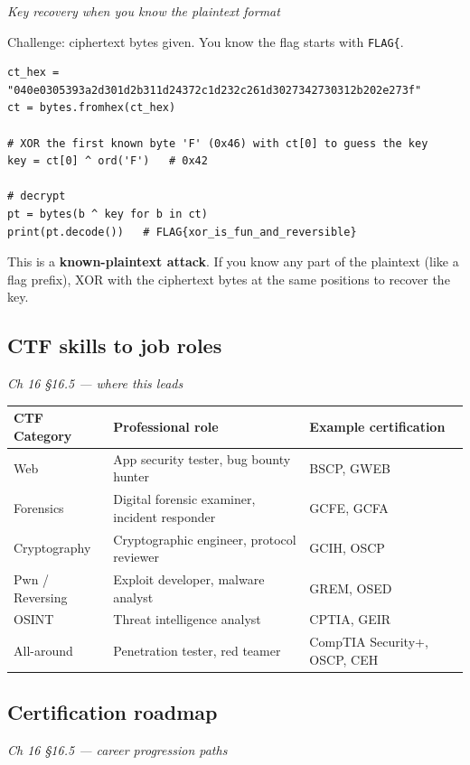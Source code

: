 \documentclass[12pt,openany]{book}
\begin{document}
{\small\itshape\color{gray}Key recovery when you know the plaintext format}

Challenge: ciphertext bytes given. You know the flag starts with \texttt{FLAG\{}.


\begin{lstlisting}
ct_hex = "040e0305393a2d301d2b311d24372c1d232c261d3027342730312b202e273f"
ct = bytes.fromhex(ct_hex)

# XOR the first known byte 'F' (0x46) with ct[0] to guess the key
key = ct[0] ^ ord('F')   # 0x42

# decrypt
pt = bytes(b ^ key for b in ct)
print(pt.decode())   # FLAG{xor_is_fun_and_reversible}\end{lstlisting}


This is a \textbf{known-plaintext attack}. If you know any part of the plaintext (like a flag prefix), XOR with the ciphertext bytes at the same positions to recover the key.

\medskip

\subsection*{CTF skills to job roles}
{\small\itshape\color{gray}Ch 16 §16.5 --- where this leads}

\begin{center}\small\begin{tabular}{p{4.3cm}p{4.3cm}p{4.3cm}}\toprule
\textbf{CTF Category} & \textbf{Professional role} & \textbf{Example certification} \\ \midrule
Web & App security tester, bug bounty hunter & BSCP, GWEB \\
Forensics & Digital forensic examiner, incident responder & GCFE, GCFA \\
Cryptography & Cryptographic engineer, protocol reviewer & GCIH, OSCP \\
Pwn / Reversing & Exploit developer, malware analyst & GREM, OSED \\
OSINT & Threat intelligence analyst & CPTIA, GEIR \\
All-around & Penetration tester, red teamer & CompTIA Security+, OSCP, CEH \\
\bottomrule\end{tabular}\end{center}

\medskip

\subsection*{Certification roadmap}
{\small\itshape\color{gray}Ch 16 §16.5 --- career progression paths}
\end{document}
